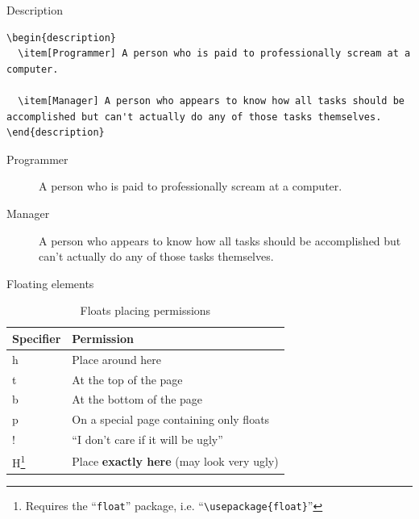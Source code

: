 \documentclass[xetex, onlymath]{beamer}
\begin{document}
\begin{frame}[fragile]{Description}
\begin{lstlisting}
\begin{description}
  \item[Programmer] A person who is paid to professionally scream at a computer.
  
  \item[Manager] A person who appears to know how all tasks should be accomplished but can't actually do any of those tasks themselves.
\end{description}
\end{lstlisting}

\begin{exampleblock}{}
\begin{description}
  \item[Programmer] A person who is paid to professionally scream at a computer.
  \item[Manager] A person who appears to know how all tasks should be accomplished but can't actually do any of those tasks themselves.
\end{description}
\end{exampleblock}
\end{frame}

\begin{frame}{Floating elements}
\begin{table}
	\caption{Floats placing permissions}
	\begin{tabular}{>{\ttfamily}l l}
		\toprule
		\textsf{Specifier} & Permission \\
		\midrule
		h & Place around here \\
		t & At the top of the page \\
		b & At the bottom of the page \\
		p & On a special page containing only floats \\
		! & ``I don't care if it will be ugly'' \\
		H\footnote{Requires the ``\texttt{float}'' package, i.e. 
			``\texttt{\textbackslash usepackage\{float\}}''} 
		  & Place \textbf{exactly here} (may look very ugly) \\
		\bottomrule
	\end{tabular}
\end{table}
\end{frame}
\end{document}
